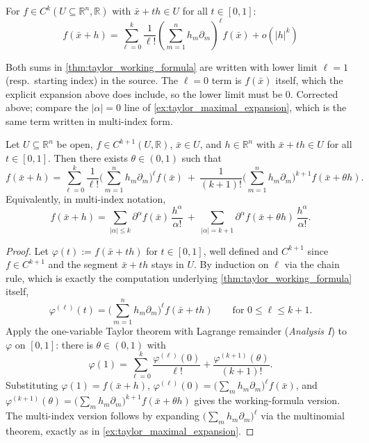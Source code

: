 \begin{theorem}
\label{thm:taylor_working_formula}
For $f \in C^k(U \subseteq \mathbb{R}^n, \mathbb{R})$ with $\bar x + th \in U$ for all
$t \in [0,1]$:
\[f(\bar x + h) = \sum_{\ell=0}^{k}\frac{1}{\ell!}\left(\sum_{m=1}^{n} h_m\partial_m\right)^{\!\ell} f(\bar x) + o(|h|^k)\]
\end{theorem}

\begin{ainote}
Both sums in \cref{thm:taylor_working_formula} are written with lower limit $\ell = 1$ (resp.\
starting index) in the source. The $\ell = 0$ term is $f(\bar x)$ itself, which the explicit
expansion above does include, so the lower limit must be $0$. Corrected above; compare the
$|\alpha| = 0$ line of \cref{ex:taylor_maximal_expansion}, which is the same term written in
multi-index form.
\end{ainote}

\begin{theorem}
\label{thm:taylor_lagrange_remainder}
Let $U \subseteq \mathbb{R}^n$ be open, $f \in C^{k+1}(U,\mathbb{R})$, $\bar x \in U$, and
$h \in \mathbb{R}^n$ with $\bar x+th \in U$ for all $t \in [0,1]$. Then there exists
$\theta \in (0,1)$ such that
\[f(\bar x+h) = \sum_{\ell=0}^{k}\frac{1}{\ell!}\Big(\sum_{m=1}^n h_m\partial_m\Big)^{\!\ell}
  f(\bar x)
  \ +\ \frac{1}{(k+1)!}\Big(\sum_{m=1}^n h_m\partial_m\Big)^{\!k+1}f(\bar x+\theta h).\]
Equivalently, in multi-index notation,
\[f(\bar x+h) = \sum_{|\alpha|\leq k}\partial^\alpha f(\bar x)\,\frac{h^\alpha}{\alpha!}
  \ +\ \sum_{|\alpha|=k+1}\partial^\alpha f(\bar x+\theta h)\,\frac{h^\alpha}{\alpha!}.\]
\end{theorem}

\begin{proof}
Let $\varphi(t) := f(\bar x+th)$ for $t \in [0,1]$, well defined and $C^{k+1}$ since $f \in
C^{k+1}$ and the segment $\bar x+th$ stays in $U$. By induction on $\ell$ via the chain rule,
which is exactly the computation underlying \cref{thm:taylor_working_formula} itself,
\[\varphi^{(\ell)}(t) = \Big(\sum_{m=1}^n h_m\partial_m\Big)^{\!\ell}f(\bar x+th)
  \qquad \text{for } 0 \leq \ell \leq k+1.\]
Apply the one-variable Taylor theorem with Lagrange remainder (\emph{Analysis I}) to $\varphi$
on $[0,1]$: there is $\theta \in (0,1)$ with
\[\varphi(1) = \sum_{\ell=0}^k\frac{\varphi^{(\ell)}(0)}{\ell!} + \frac{\varphi^{(k+1)}(\theta)}{(k+1)!}.\]
Substituting $\varphi(1) = f(\bar x+h)$, $\varphi^{(\ell)}(0) = \big(\sum_mh_m\partial_m\big)^\ell
f(\bar x)$, and $\varphi^{(k+1)}(\theta) = \big(\sum_mh_m\partial_m\big)^{k+1}f(\bar x+\theta h)$
gives the working-formula version. The multi-index version follows by expanding
$\big(\sum_mh_m\partial_m\big)^\ell$ via the multinomial theorem, exactly as in
\cref{ex:taylor_maximal_expansion}.
\end{proof}

